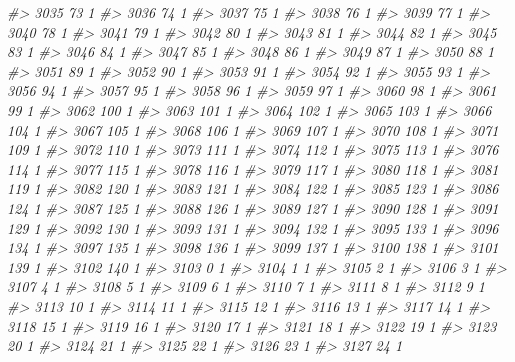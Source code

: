 \documentclass[]{article}
\newenvironment{Shaded}{\begin{snugshade}}{\end{snugshade}}
\newcommand{\CommentTok}[1]{\textcolor[rgb]{0.56,0.35,0.01}{\textit{#1}}}
\begin{document}
\begin{Shaded}
\begin{Highlighting}[]
\CommentTok{#> 3035  73  1}
\CommentTok{#> 3036  74  1}
\CommentTok{#> 3037  75  1}
\CommentTok{#> 3038  76  1}
\CommentTok{#> 3039  77  1}
\CommentTok{#> 3040  78  1}
\CommentTok{#> 3041  79  1}
\CommentTok{#> 3042  80  1}
\CommentTok{#> 3043  81  1}
\CommentTok{#> 3044  82  1}
\CommentTok{#> 3045  83  1}
\CommentTok{#> 3046  84  1}
\CommentTok{#> 3047  85  1}
\CommentTok{#> 3048  86  1}
\CommentTok{#> 3049  87  1}
\CommentTok{#> 3050  88  1}
\CommentTok{#> 3051  89  1}
\CommentTok{#> 3052  90  1}
\CommentTok{#> 3053  91  1}
\CommentTok{#> 3054  92  1}
\CommentTok{#> 3055  93  1}
\CommentTok{#> 3056  94  1}
\CommentTok{#> 3057  95  1}
\CommentTok{#> 3058  96  1}
\CommentTok{#> 3059  97  1}
\CommentTok{#> 3060  98  1}
\CommentTok{#> 3061  99  1}
\CommentTok{#> 3062 100  1}
\CommentTok{#> 3063 101  1}
\CommentTok{#> 3064 102  1}
\CommentTok{#> 3065 103  1}
\CommentTok{#> 3066 104  1}
\CommentTok{#> 3067 105  1}
\CommentTok{#> 3068 106  1}
\CommentTok{#> 3069 107  1}
\CommentTok{#> 3070 108  1}
\CommentTok{#> 3071 109  1}
\CommentTok{#> 3072 110  1}
\CommentTok{#> 3073 111  1}
\CommentTok{#> 3074 112  1}
\CommentTok{#> 3075 113  1}
\CommentTok{#> 3076 114  1}
\CommentTok{#> 3077 115  1}
\CommentTok{#> 3078 116  1}
\CommentTok{#> 3079 117  1}
\CommentTok{#> 3080 118  1}
\CommentTok{#> 3081 119  1}
\CommentTok{#> 3082 120  1}
\CommentTok{#> 3083 121  1}
\CommentTok{#> 3084 122  1}
\CommentTok{#> 3085 123  1}
\CommentTok{#> 3086 124  1}
\CommentTok{#> 3087 125  1}
\CommentTok{#> 3088 126  1}
\CommentTok{#> 3089 127  1}
\CommentTok{#> 3090 128  1}
\CommentTok{#> 3091 129  1}
\CommentTok{#> 3092 130  1}
\CommentTok{#> 3093 131  1}
\CommentTok{#> 3094 132  1}
\CommentTok{#> 3095 133  1}
\CommentTok{#> 3096 134  1}
\CommentTok{#> 3097 135  1}
\CommentTok{#> 3098 136  1}
\CommentTok{#> 3099 137  1}
\CommentTok{#> 3100 138  1}
\CommentTok{#> 3101 139  1}
\CommentTok{#> 3102 140  1}
\CommentTok{#> 3103   0  1}
\CommentTok{#> 3104   1  1}
\CommentTok{#> 3105   2  1}
\CommentTok{#> 3106   3  1}
\CommentTok{#> 3107   4  1}
\CommentTok{#> 3108   5  1}
\CommentTok{#> 3109   6  1}
\CommentTok{#> 3110   7  1}
\CommentTok{#> 3111   8  1}
\CommentTok{#> 3112   9  1}
\CommentTok{#> 3113  10  1}
\CommentTok{#> 3114  11  1}
\CommentTok{#> 3115  12  1}
\CommentTok{#> 3116  13  1}
\CommentTok{#> 3117  14  1}
\CommentTok{#> 3118  15  1}
\CommentTok{#> 3119  16  1}
\CommentTok{#> 3120  17  1}
\CommentTok{#> 3121  18  1}
\CommentTok{#> 3122  19  1}
\CommentTok{#> 3123  20  1}
\CommentTok{#> 3124  21  1}
\CommentTok{#> 3125  22  1}
\CommentTok{#> 3126  23  1}
\CommentTok{#> 3127  24  1}

\end{Highlighting}
\end{Shaded}
\end{document}
